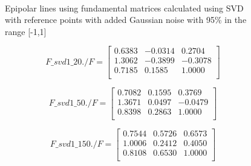 \documentclass[peerreview,11pt]{IEEEtran}
\begin{document}
\begin{figure}[ht]
	~
	\\
		
		
	\caption{Epipolar lines using fundamental matrices calculated using SVD with reference points with added Gaussian noise with 95\% in the range [-1,1]}
	\label{fig:svd_n1}
\end{figure}

\[
F\_svd1\_20./F = 
\begin{bmatrix}
    0.6383  & -0.0314  &  0.2704\\
    1.3062  & -0.3899  & -0.3078\\
    0.7185  &  0.1585  &  1.0000\\
\end{bmatrix}
\]


\[
F\_svd1\_50./F = 
\begin{bmatrix}
    0.7082  &  0.1595  &  0.3769\\
    1.3671  &  0.0497  & -0.0479\\
    0.8398  &  0.2863  &  1.0000\\
\end{bmatrix}
\]


\[
F\_svd1\_150./F = 
\begin{bmatrix}
    0.7544  &  0.5726  &  0.6573\\
    1.0006  &  0.2412  &  0.4050\\
    0.8108  &  0.6530  &  1.0000\\
\end{bmatrix}
\]
\end{document}
